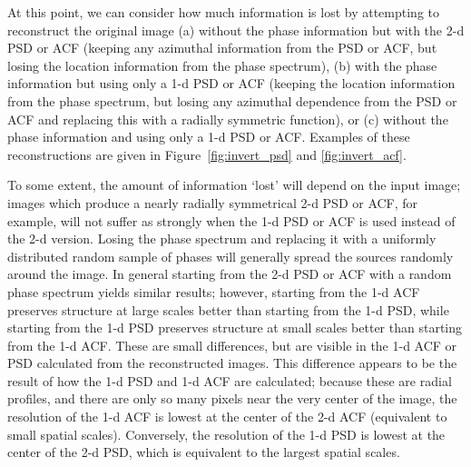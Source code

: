 \documentclass[11pt,preprint]{aastex}
\begin{document}
At this point, we can consider how much information is lost by attempting to reconstruct the original image (a) without the phase information but with the 2-d PSD or ACF (keeping any azimuthal information from the PSD or ACF, but losing the location information from the phase spectrum), (b) with the phase information but using only a 1-d PSD or ACF (keeping the location information from the phase spectrum, but losing any azimuthal dependence from the PSD or ACF and replacing this with a radially symmetric function), or (c) without the phase information and using only a 1-d PSD or ACF.  Examples of these reconstructions are given in Figure~\ref{fig:invert_psd} and \ref{fig:invert_acf}. 

To some extent, the amount of information `lost' will depend on the input image; images which produce a nearly radially symmetrical 2-d PSD or ACF, for example, will not suffer as strongly when the 1-d PSD or ACF is used instead of the 2-d version. Losing the phase spectrum and replacing it with a uniformly distributed random sample of phases will generally spread the sources randomly around the image. In general starting from the 2-d PSD or ACF with a random phase spectrum yields similar results; however, starting from the 1-d ACF preserves structure at large scales better than starting from the 1-d PSD, while starting from the 1-d PSD preserves structure at small scales better than starting from the 1-d ACF. These are small differences, but are visible in the 1-d ACF or PSD calculated from the reconstructed images.  This difference appears to be the result of how the 1-d PSD and 1-d ACF are calculated; because these are radial profiles, and there are only so many pixels near the very center of the image, the resolution of the 1-d ACF is lowest at the center of the 2-d ACF (equivalent to small spatial scales). Conversely, the resolution of the 1-d PSD is lowest at the center of the 2-d PSD, which is equivalent to the largest spatial scales. 
\end{document}
